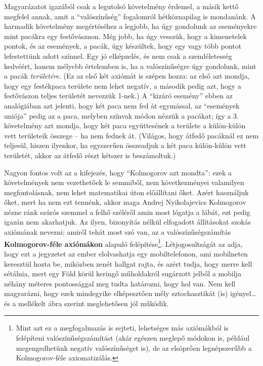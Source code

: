 \documentclass[magyar,]{book}
\let\rmarkdownfootnote\footnote%
\def\footnote{\protect\rmarkdownfootnote}
\begin{document}
Magyarázatot igazából csak a legutolsó követelmény érdemel, a másik kettő megfelel annak, amit a \enquote{valószínűség} fogalomról hétköznapilag is mondanánk. A harmadik követelmény megértéséhez a legjobb, ha úgy gondolunk az eseményekre mint pacákra egy festővásznon. Még jobb, ha úgy vesszük, hogy a kimenetelek pontok, és az események, a pacák, úgy készültek, hogy egy vagy több pontot lefestettünk adott színnel. Egy jó elképzelés, és nem csak a szemléletesség kedvéért, hanem mélyebb értelemben is, ha a valószínűségre úgy gondolunk, mint a pacák \emph{területére}. (Ez az első két axiómát is szépen hozza: az első azt mondja, hogy egy festékpaca területe nem lehet negatív, a második pedig azt, hogy a festővászon teljes területét nevezzük 1-nek.) A \enquote{kizáró esemény} ebben az analógiában azt jelenti, hogy két paca nem fed át egymással, az \enquote{események uniója} pedig az a paca, melyben színvak módon nézzük a pacákat; így a 3. követelmény azt mondja, hogy két paca együttesének a területe a külön-külön vett területeik összege -- ha nem fednek át. (Világos, hogy átfedő pacáknál ez nem teljesül, hiszen ilyenkor, ha egyszerűen összeadjuk a két paca külön-külön vett területét, akkor az átfedő részt kétszer is beszámoltuk.)

Nagyon fontos volt az a kifejezés, hogy \enquote{Kolmogorov azt mondta}: ezek a követelmények nem vezethetőek le semmiből, nem következményei valamilyen megfontolásnak, nem lehet matematikai úton előállítani őket. Azért használjuk őket, mert ha nem ezt tennénk, akkor maga Andrej Nyikolajevics Kolmogorov nézne ránk szúrós szemmel a felhő széléről amin most lógatja a lábát, ezt pedig igazán nem akarhatjuk. Az ilyen, bizonyítás nélkül elfogadott állításokat szokás axiómának nevezni; amiről tehát most szó van, az a valószínűségszámítás \textbf{Kolmogorov-féle axiómákon} alapuló felépítése\footnote{Mint azt ez a megfogalmazás is sejteti, lehetséges más axiómákból is felépíteni valószínűségszámítást (akár egészen meglepő módokon is, például megengedhetünk negatív valószínűséget is), de az elsöprően legnépszerűbb a Kolmogorov-féle axiomatizálás.}. Létjogosultságát az adja, hogy ezt a jegyzetet az ember elolvashatja egy mobiltelefonon, ami mobilneten keresztül hozta be, miközben zenét hallgat rajta, és azért tudja, hogy merre kell sétálnia, mert egy Föld körül keringő műholdakról sugárzott jelből a mobilja néhány méteres pontossággal meg tudta határozni, hogy hol van. Nem kell magyarázni, hogy ezek mindegyike elképesztően mély sztochasztikát (is) igényel\ldots{} és a mellékelt ábra szerint meglehetősen jól működik.
\end{document}
